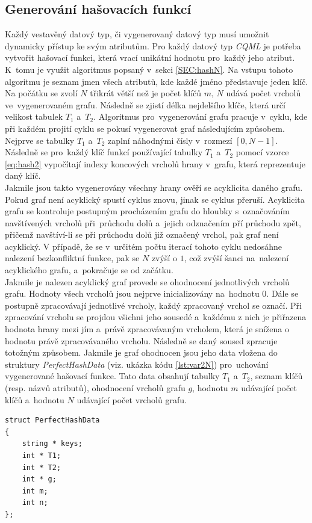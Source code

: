 \documentclass[11pt,twoside,a4paper]{book}
\begin{document}
\subsection{\label{SEC:hashI}Generování hašovacích funkcí}
Každý vestavěný datový typ, či vygenerovaný datový typ musí umožnit dynamicky přístup ke svým atributům.
Pro každý datový typ \textit{CQML} je potřeba vytvořit hašovací funkci, která vrací unikátní hodnotu pro~každý jeho atribut. K~tomu je využit algoritmus popsaný v~sekci \ref{SEC:hashN}. Na vstupu tohoto algoritmu je seznam jmen všech atributů, kde každé jméno představuje jeden klíč. Na počátku se zvolí $N$ třikrát větší než je počet klíčů $m$, $N$ udává počet vrcholů ve~vygenerovaném grafu. Následně se zjistí délka nejdelšího klíče, která určí velikost tabulek $T_1$ a~$T_2$. Algoritmus pro~vygenerování grafu pracuje v~cyklu, kde při každém projití cyklu se pokusí vygenerovat graf následujícím způsobem.
Nejprve se tabulky $T_1$ a~$T_2$ zaplní náhodnými čísly v~rozmezí $[0,N-1]$. Následně se pro~každý klíč funkcí používající tabulky $T_1$ a~$T_2$ pomocí vzorce \ref{eq:hash2} vypočítají indexy koncových vrcholů hrany v~grafu, která reprezentuje daný klíč.\\
Jakmile jsou takto vygenerovány všechny hrany ověří se acyklicita daného grafu. Pokud graf není acyklický spustí cyklus znovu, jinak se cyklus přeruší. Acyklicita grafu se kontroluje postupným procházením grafu do hloubky s~označováním navštívených vrcholů při~průchodu dolů a~jejich odznačením pří průchodu zpět, přičemž navštíví-li se při průchodu dolů již označený vrchol, pak graf není acyklický.
V případě, že se v~určitém počtu iterací tohoto cyklu nedosáhne nalezení bezkonfliktní funkce, pak se $N$ zvýší o $1$, což zvýší šanci na~nalezení acyklického grafu, a~pokračuje se od začátku.\\
Jakmile je nalezen acyklický graf provede se ohodnocení jednotlivých vrcholů grafu. Hodnoty všech vrcholů jsou nejprve inicializovány na~hodnotu $0$. Dále se postupně zpracovávají jednotlivé vrcholy, každý zpracovaný vrchol se označí. Při zpracování vrcholu se projdou všichni jeho sousedé a~každému z nich je přiřazena hodnota hrany mezi jím a~právě zpracovávaným vrcholem, která je snížena o hodnotu právě zpracovávaného vrcholu. Následně se daný soused zpracuje totožným způsobem. Jakmile je graf ohodnocen jsou jeho data vložena do struktury \textit{PerfectHashData} (viz. ukázka kódu \ref{lst:var2N}) pro~uchování vygenerované hašovací funkce. Tato data obsahují tabulky $T_1$ a~$T_2$, seznam klíčů (resp. názvů atributů), ohodnocení vrcholů grafu $g$, hodnotu $m$ udávající počet klíčů a~hodnotu $N$ udávající počet vrcholů grafu.
\begin{lstlisting}[frame=single,caption=Struktura pro~uchování hašovací funkce.,label=lst:var2N]
struct PerfectHashData
{
	string * keys;
	int * T1;
	int * T2;
	int * g;
	int m;
	int n;
};
\end{lstlisting}
\end{document}
